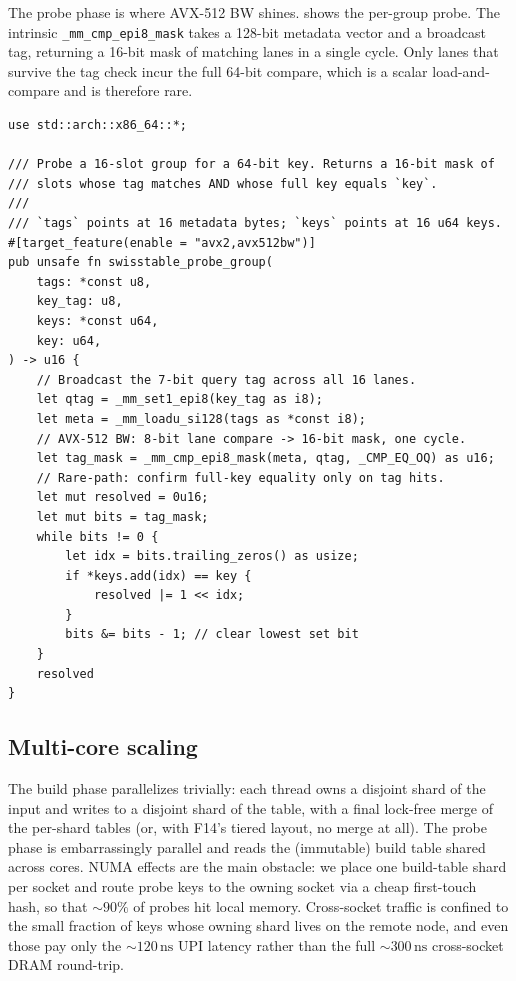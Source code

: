 \documentclass[10pt]{article}
\theoremstyle{definition}
\begin{document}
The probe phase is where AVX-512 BW shines.  shows the per-group probe. The intrinsic \texttt{\_mm\_cmp\_epi8\_mask} takes a 128-bit metadata vector and a broadcast tag, returning a 16-bit mask of matching lanes in a single cycle. Only lanes that survive the tag check incur the full 64-bit compare, which is a scalar load-and-compare and is therefore rare.

\begin{lstlisting}[caption={SwissTable-style 16-slot group probe using AVX-512 BW.},label={lst:probe}]
use std::arch::x86_64::*;

/// Probe a 16-slot group for a 64-bit key. Returns a 16-bit mask of
/// slots whose tag matches AND whose full key equals `key`.
///
/// `tags` points at 16 metadata bytes; `keys` points at 16 u64 keys.
#[target_feature(enable = "avx2,avx512bw")]
pub unsafe fn swisstable_probe_group(
    tags: *const u8,
    key_tag: u8,
    keys: *const u64,
    key: u64,
) -> u16 {
    // Broadcast the 7-bit query tag across all 16 lanes.
    let qtag = _mm_set1_epi8(key_tag as i8);
    let meta = _mm_loadu_si128(tags as *const i8);
    // AVX-512 BW: 8-bit lane compare -> 16-bit mask, one cycle.
    let tag_mask = _mm_cmp_epi8_mask(meta, qtag, _CMP_EQ_OQ) as u16;
    // Rare-path: confirm full-key equality only on tag hits.
    let mut resolved = 0u16;
    let mut bits = tag_mask;
    while bits != 0 {
        let idx = bits.trailing_zeros() as usize;
        if *keys.add(idx) == key {
            resolved |= 1 << idx;
        }
        bits &= bits - 1; // clear lowest set bit
    }
    resolved
}
\end{lstlisting}

\subsection{Multi-core scaling}

The build phase parallelizes trivially: each thread owns a disjoint shard of the input and writes to a disjoint shard of the table, with a final lock-free merge of the per-shard tables (or, with F14's tiered layout, no merge at all). The probe phase is embarrassingly parallel and reads the (immutable) build table shared across cores. NUMA effects are the main obstacle: we place one build-table shard per socket and route probe keys to the owning socket via a cheap first-touch hash, so that $\sim\!90\%$ of probes hit local memory. Cross-socket traffic is confined to the small fraction of keys whose owning shard lives on the remote node, and even those pay only the $\sim\!120\,\text{ns}$ UPI latency rather than the full $\sim\!300\,\text{ns}$ cross-socket DRAM round-trip.
\end{document}
